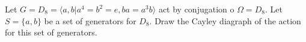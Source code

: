 \documentclass[12pt,letterpaper,boxed]{hmcpset}
\begin{document}
\begin{solution}
\end{solution}

\clearpage

\begin{problem}[4.2.4]
Let $G = D_8 = \langle a,b \vert a^4 = b^2 = e, ba = a^3b \rangle$ act by conjugation o $\Omega = D_8$. Let $S = \{ a,b \}$ be a set of generators for $D_8$. Draw the Cayley diagraph of the action for this set of generators. 
\end{problem}

\begin{solution}

\end{solution}
\end{document}
